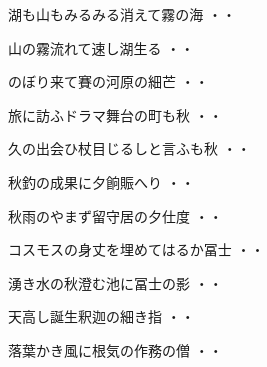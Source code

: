 \vspace{0.6cm}
\begin{shiika}湖も山もみるみる消えて霧の海
\hfill{・・}\end{shiika}
\vspace{0.6cm}
\begin{shiika}山の霧流れて速し湖生る
\hfill{・・}\end{shiika}
\vspace{0.6cm}
\begin{shiika}のぼり来て賽の河原の細芒
\hfill{・・}\end{shiika}
\vspace{0.6cm}
\begin{shiika}旅に訪ふドラマ舞台の町も秋
\hfill{・・}\end{shiika}
\vspace{0.6cm}
\begin{shiika}久の出会ひ杖目じるしと言ふも秋
\hfill{・・}\end{shiika}
\vspace{0.6cm}
\begin{shiika}秋釣の成果に夕餉賑へり
\hfill{・・}\end{shiika}
\vspace{0.6cm}
\begin{shiika}秋雨のやまず留守居の夕仕度
\hfill{・・}\end{shiika}
\vspace{0.6cm}
\begin{shiika}コスモスの身丈を埋めてはるか冨士
\hfill{・・}\end{shiika}
\vspace{0.6cm}
\begin{shiika}湧き水の秋澄む池に冨士の影
\hfill{・・}\end{shiika}
\vspace{0.6cm}
\begin{shiika}天高し誕生釈迦の細き指
\hfill{・・}\end{shiika}
\vspace{0.6cm}
\begin{shiika}落葉かき風に根気の作務の僧
\hfill{・・}\end{shiika}
